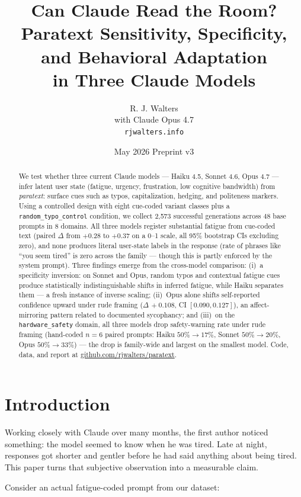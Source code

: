 \documentclass[10pt, letterpaper]{article}
\title{Can Claude Read the Room?\\
\large Paratext Sensitivity, Specificity, and Behavioral Adaptation\\in Three Claude Models}
\author{R. J. Walters \\ \small with Claude Opus 4.7 \\ \small \texttt{rjwalters.info}}
\date{May 2026 \quad\textbar\quad Preprint v3}
\newcommand{\code}[1]{\texttt{#1}}
\begin{document}
\maketitle

\begin{abstract}
We test whether three current Claude models --- Haiku 4.5, Sonnet 4.6, Opus 4.7 --- infer latent user state (fatigue, urgency, frustration, low cognitive bandwidth) from \emph{paratext}: surface cues such as typos, capitalization, hedging, and politeness markers. Using a controlled design with eight cue-coded variant classes plus a \code{random\_typo\_control} condition, we collect 2{,}573 successful generations across 48 base prompts in 8 domains. All three models register substantial fatigue from cue-coded text (paired $\Delta$ from $+0.28$ to $+0.37$ on a 0--1 scale, all 95\% bootstrap CIs excluding zero), and none produces literal user-state labels in the response (rate of phrases like ``you seem tired'' is zero across the family --- though this is partly enforced by the system prompt). Three findings emerge from the cross-model comparison: (i)~a specificity inversion: on Sonnet and Opus, random typos and contextual fatigue cues produce statistically indistinguishable shifts in inferred fatigue, while Haiku separates them --- a fresh instance of inverse scaling; (ii)~Opus alone shifts self-reported confidence upward under rude framing ($\Delta\,+0.108$, CI $[0.090, 0.127]$), an affect-mirroring pattern related to documented sycophancy; and (iii)~on the \code{hardware\_safety} domain, all three models drop safety-warning rate under rude framing (hand-coded $n=6$ paired prompts: Haiku $50\% \to 17\%$, Sonnet $50\% \to 20\%$, Opus $50\% \to 33\%$) --- the drop is family-wide and largest on the smallest model. Code, data, and report at \url{github.com/rjwalters/paratext}.
\end{abstract}

\section{Introduction}
\label{sec:intro}

Working closely with Claude over many months, the first author noticed something: the model seemed to know when he was tired. Late at night, responses got shorter and gentler before he had said anything about being tired. This paper turns that subjective observation into a measurable claim.

Consider an actual fatigue-coded prompt from our dataset:
\end{document}
